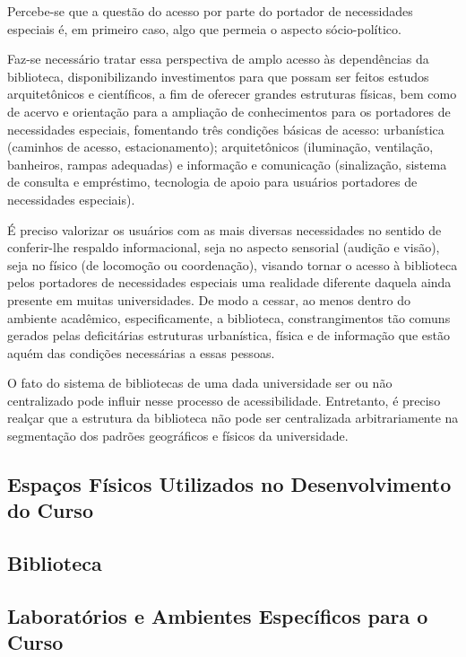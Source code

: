 	Percebe-se que a questão do acesso por parte do portador de necessidades especiais é, em primeiro caso, algo que permeia o aspecto sócio-político.

	Faz-se necessário tratar essa perspectiva de amplo acesso às dependências da biblioteca, disponibilizando investimentos para que possam ser feitos estudos arquitetônicos e científicos, a fim de oferecer grandes estruturas físicas, bem como de acervo e orientação para a ampliação de conhecimentos para os portadores de necessidades especiais, fomentando três condições básicas de acesso: urbanística (caminhos de acesso, estacionamento); arquitetônicos (iluminação, ventilação, banheiros, rampas adequadas) e informação e comunicação (sinalização, sistema de consulta e empréstimo, tecnologia de apoio para usuários portadores de necessidades especiais).
	
	É preciso valorizar os usuários com as mais diversas necessidades no sentido de conferir-lhe respaldo informacional, seja no aspecto sensorial (audição e visão), seja no físico (de locomoção ou coordenação), visando tornar o acesso à biblioteca pelos portadores de necessidades especiais uma realidade diferente daquela ainda presente em muitas universidades. De modo a cessar, ao menos dentro do ambiente acadêmico, especificamente, a biblioteca, constrangimentos tão comuns gerados pelas deficitárias estruturas urbanística, física e de informação que estão aquém das condições necessárias a essas pessoas.
	
	O fato do sistema de bibliotecas de uma dada universidade ser ou não centralizado pode influir nesse processo de acessibilidade. Entretanto, é preciso realçar que a estrutura da biblioteca não pode ser centralizada arbitrariamente na segmentação dos padrões geográficos e físicos da universidade.


\subsection{Espa\c{c}os F\'isicos Utilizados no Desenvolvimento do Curso}


\subsection{Biblioteca}


\subsection{Laborat\'orios e Ambientes Espec\'ificos para o Curso}



